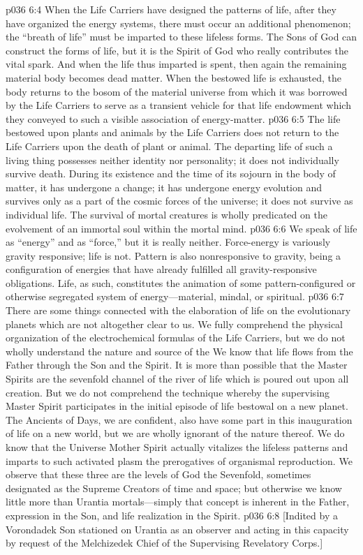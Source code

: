 \pc \vs p036 6:4 When the Life Carriers have designed the patterns of life, after they have organized the energy systems, there must occur an additional phenomenon; the “breath of life” must be imparted to these lifeless forms. The Sons of God can construct the forms of life, but it is the Spirit of God who really contributes the vital spark. And when the life thus imparted is spent, then again the remaining material body becomes dead matter. When the bestowed life is exhausted, the body returns to the bosom of the material universe from which it was borrowed by the Life Carriers to serve as a transient vehicle for that life endowment which they conveyed to such a visible association of energy\hyp{}matter.
\vs p036 6:5 The life bestowed upon plants and animals by the Life Carriers does not return to the Life Carriers upon the death of plant or animal. The departing life of such a living thing possesses neither identity nor personality; it does not individually survive death. During its existence and the time of its sojourn in the body of matter, it has undergone a change; it has undergone energy evolution and survives only as a part of the cosmic forces of the universe; it does not survive as individual life. The survival of mortal creatures is wholly predicated on the evolvement of an immortal soul within the mortal mind.
\pc \vs p036 6:6 We speak of life as “energy” and as “force,” but it is really neither. Force\hyp{}energy is variously gravity responsive; life is not. Pattern is also nonresponsive to gravity, being a configuration of energies that have already fulfilled all gravity\hyp{}responsive obligations. Life, as such, constitutes the animation of some pattern\hyp{}configured or otherwise segregated system of energy---material, mindal, or spiritual.
\pc \vs p036 6:7 There are some things connected with the elaboration of life on the evolutionary planets which are not altogether clear to us. We fully comprehend the physical organization of the electrochemical formulas of the Life Carriers, but we do not wholly understand the nature and source of the  We know that life flows from the Father through the Son and  the Spirit. It is more than possible that the Master Spirits are the sevenfold channel of the river of life which is poured out upon all creation. But we do not comprehend the technique whereby the supervising Master Spirit participates in the initial episode of life bestowal on a new planet. The Ancients of Days, we are confident, also have some part in this inauguration of life on a new world, but we are wholly ignorant of the nature thereof. We do know that the Universe Mother Spirit actually vitalizes the lifeless patterns and imparts to such activated plasm the prerogatives of organismal reproduction. We observe that these three are the levels of God the Sevenfold, sometimes designated as the Supreme Creators of time and space; but otherwise we know little more than Urantia mortals---simply that concept is inherent in the Father, expression in the Son, and life realization in the Spirit.
\vsetoff
\vs p036 6:8 [Indited by a Vorondadek Son stationed on Urantia as an observer and acting in this capacity by request of the Melchizedek Chief of the Supervising Revelatory Corps.]\plusone
